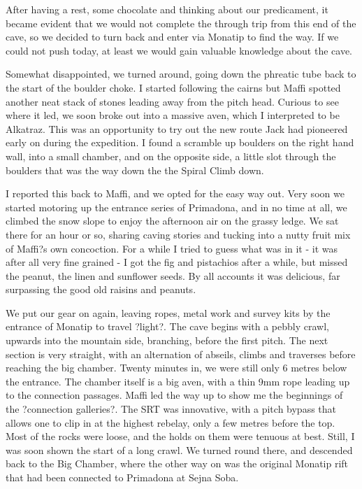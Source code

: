 \documentclass[onecolumn]{book}
\begin{document}
After having a rest, some chocolate and thinking about our predicament, it became evident that we would not complete the through trip from this end of the cave, so we decided to turn back and enter via Monatip to find the way. If we could not push today, at least we would gain valuable knowledge about the cave. 

Somewhat disappointed, we turned around, going down the phreatic tube back to the start of the boulder choke. I started following the cairns but Maffi spotted another neat stack of stones leading away from the pitch head. Curious to see where it led, we soon broke out into a massive aven, which I interpreted to be Alkatraz. This was an opportunity to try out the new route Jack had pioneered early on during the expedition. I found a scramble up boulders on the right hand wall, into a small chamber, and on the opposite side, a little slot through the boulders that was the way down the the Spiral Climb down. 

I reported this back to Maffi, and we opted for the easy way out. Very soon we started motoring up the entrance series of Primadona, and in no time at all, we climbed the snow slope to enjoy the afternoon air on the grassy ledge. We sat there for an hour or so, sharing caving stories and tucking into a nutty fruit mix of Maffi?s own concoction. For a while I tried to guess what was in it - it was after all very fine grained - I got the fig and pistachios after a while, but missed the peanut, the linen and sunflower seeds. By all accounts it was delicious, far surpassing the good old raisins and peanuts. 

We put our gear on again, leaving ropes, metal work and survey kits by the entrance of Monatip to travel ?light?. The cave begins with a pebbly crawl, upwards into the mountain side, branching, before the first pitch. The next section is very straight, with an alternation of abseils, climbs and traverses before reaching the big chamber. Twenty minutes in, we were still only 6 metres below the entrance. The chamber itself is a big aven, with a thin 9mm rope leading up to the connection passages. Maffi led the way up to show me the beginnings of the ?connection galleries?. The SRT was innovative, with a pitch bypass that allows one to clip in at the highest rebelay, only a few metres before the top. Most of the rocks were loose, and the holds on them were tenuous at best. Still, I was soon shown the start of a long crawl. We turned round there, and descended back to the Big Chamber, where the other way on was the original Monatip rift that had been connected to Primadona at Sejna Soba. 
\end{document}
